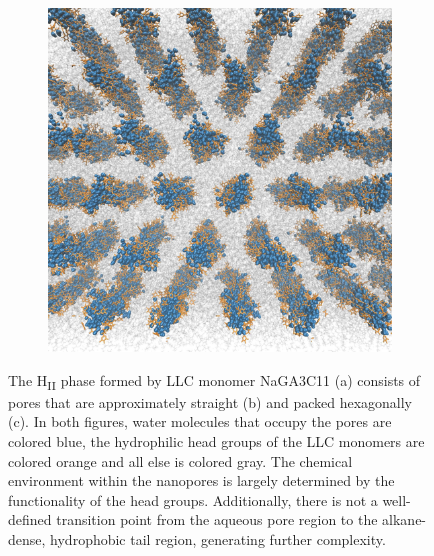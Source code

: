 \documentclass[journal=jpcbfk,manuscript=article]{achemso}
\begin{document}
\begin{figure}
\begin{subfigure}{0.325\textwidth}
  \includegraphics[width=\textwidth]{top_view.pdf}
  \caption{}
  \end{subfigure}
  \caption{The H\textsubscript{II} phase formed by LLC monomer NaGA3C11 (a)
  consists of pores that are approximately straight (b) and packed hexagonally (c).
  In both figures, water molecules that occupy the pores are colored blue, 
  the hydrophilic head groups of the LLC monomers are colored orange and all else is colored gray. 
  The chemical environment within the nanopores is largely determined by the functionality
  of the head groups. Additionally, there is not a well-defined transition
  point from the aqueous pore region to the alkane-dense, hydrophobic tail region,
  generating further complexity.
  }\label{fig:membrane_rendering}
  \end{figure}
\end{document}
